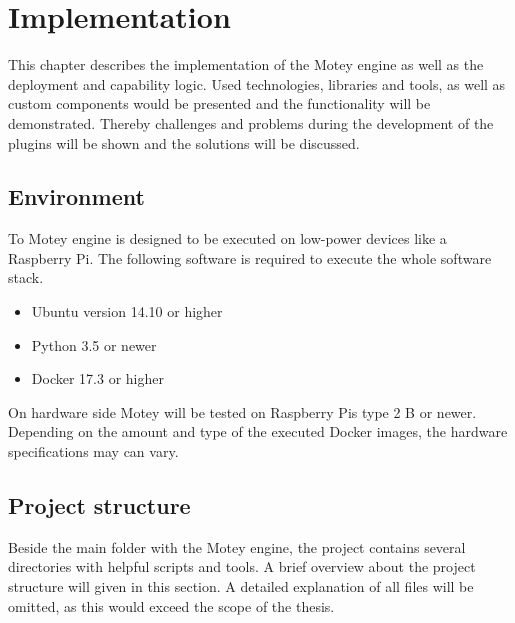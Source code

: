 \chapter{Implementation}
\label{chapter:implementation}
This chapter describes the implementation of the Motey engine as well as the deployment and capability logic.
Used technologies, libraries and tools, as well as custom components would be presented and the functionality will be demonstrated.
Thereby challenges and problems during the development of the plugins will be shown and the solutions will be discussed.

\section{Environment}
To Motey engine is designed to be executed on low-power devices like a Raspberry Pi.
The following software is required to execute the whole software stack.
\begin{itemize}
  \item Ubuntu version 14.10 or higher
  \item Python 3.5 or newer
  \item Docker 17.3 or higher
\end{itemize}
On hardware side Motey will be tested on Raspberry Pis type 2 B or newer.
Depending on the amount and type of the executed Docker images, the hardware specifications may can vary.


\section{Project structure}
Beside the main folder with the Motey engine, the project contains several directories with helpful scripts and tools.
A brief overview about the project structure will given in this section.
A detailed explanation of all files will be omitted, as this would exceed the scope of the thesis.

